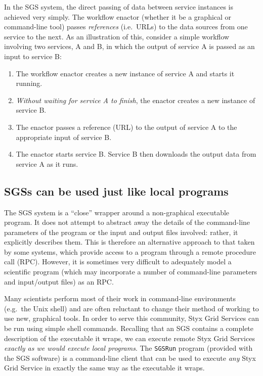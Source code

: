 \documentclass{llncs}
\begin{document}
In the SGS system, the direct passing of data between service instances is achieved very simply.  The workflow enactor (whether it be a graphical or command-line tool) passes {\em references\/} (i.e.\ URLs) to the data sources from one service to the next.  As an illustration of this, consider a simple workflow involving two services, A and B, in which the output of service A is passed as an input to service B:
\begin{enumerate}
	\item The workflow enactor creates a new instance of service A and starts it running.
	\item {\em Without waiting for service A to finish\/}, the enactor creates a new instance of service B.
	\item The enactor passes a reference (URL) to the output of service A to the appropriate input of service B.
	\item The enactor starts service B.  Service B then downloads the output data from service A as it runs.
\end{enumerate}

\subsection{SGSs can be used just like local programs}
The SGS system is a ``close'' wrapper around a non-graphical executable program.  It does not attempt to abstract away the details of the command-line parameters of the program or the input and output files involved: rather, it explicitly describes them.  This is therefore an alternative approach to that taken by some systems, which provide access to a program through a remote procedure call (RPC).  However, it is sometimes very difficult to adequately model a scientific program (which may incorporate a number of command-line parameters and input/output files) as an RPC.

Many scientists perform most of their work in command-line environments (e.g.\ the Unix shell) and are often reluctant to change their method of working to use new, graphical tools.  In order to serve this community, Styx Grid Services can be run using simple shell commands.  Recalling that an SGS contains a complete description of the executable it wraps, we can execute remote Styx Grid Services {\em exactly as we would execute local programs\/}.  The {\tt SGSRun} program (provided with the SGS software) is a command-line client that can be used to execute {\em any} Styx Grid Service in exactly the same way as the executable it wraps.
\end{document}
